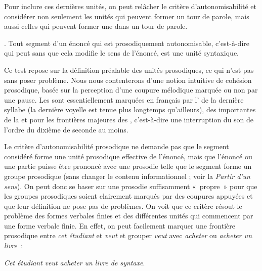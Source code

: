 Pour inclure ces dernières unités, on peut relâcher le critère d’autonomisabilité et considérer non seulement les unités qui peuvent former un tour de parole, mais aussi celles qui peuvent former une  dans un tour de parole.

{. Tout segment d’un énoncé qui est prosodiquement autonomisable, c’est-à-dire qui peut  sans que cela modifie le sens de l’énoncé, est une unité syntaxique.}

Ce test repose sur la définition préalable des unités prosodiques, ce qui n’est pas sans poser problème. Nous nous contenterons d’une notion intuitive de cohésion prosodique, basée sur la perception d’une coupure mélodique marquée ou non par une pause. Les  sont essentiellement marquées en français par l’ de la dernière syllabe (la dernière voyelle est tenue plus longtemps qu’ailleurs), des  importantes de la  et pour les frontières majeures des , c’est-à-dire une interruption du son de l’ordre du dixième de seconde au moins.

Le critère d’autonomisabilité prosodique ne demande pas que le segment considéré forme une unité prosodique effective de l’énoncé, mais que l’énoncé ou une partie puisse être prononcé avec une prosodie telle que le segment forme un groupe prosodique (sans changer le contenu informationnel ; voir la  \textit{Partir d’un sens}). On peut donc se baser sur une prosodie suffisamment «~propre~» pour que les groupes prosodiques soient clairement marqués par des coupures appuyées et que leur définition ne pose pas de problèmes. On voit que ce critère résout le problème des formes verbales finies et des différentes unités qui commencent par une forme verbale finie. En effet, on peut facilement marquer une frontière prosodique entre \textit{cet étudiant} et \textit{veut} et grouper \textit{veut} avec \textit{acheter} ou \textit{acheter un livre~}:

\ea
    {\textit{Cet étudiant}} {\textbar} {\textit{veut acheter}} {\textbar} {\textit{un livre de syntaxe}}.
\z

